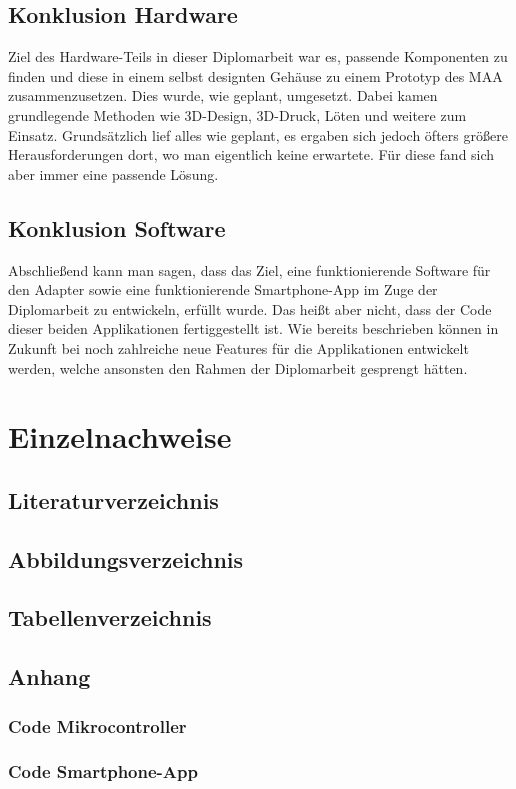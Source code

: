 \documentclass[11pt, twoside]{article}
\begin{document}
\subsection{Konklusion Hardware}
Ziel des Hardware-Teils in dieser Diplomarbeit war es, passende Komponenten zu finden und diese in einem selbst designten Gehäuse zu einem Prototyp des MAA zusammenzusetzen. Dies wurde, wie geplant, umgesetzt. Dabei kamen grundlegende Methoden wie 3D-Design, 3D-Druck, Löten und weitere zum Einsatz. Grundsätzlich lief alles wie geplant, es ergaben sich jedoch öfters größere Herausforderungen dort, wo man eigentlich keine erwartete. Für diese fand sich aber immer eine passende Lösung.
\subsection{Konklusion Software}
Abschließend kann man sagen, dass das Ziel, eine funktionierende Software für den Adapter sowie eine funktionierende Smartphone-App im Zuge der Diplomarbeit zu entwickeln, erfüllt wurde. Das heißt aber nicht, dass der Code dieser beiden Applikationen fertiggestellt ist. Wie bereits beschrieben können in Zukunft bei noch zahlreiche neue Features für die Applikationen entwickelt werden, welche ansonsten den Rahmen der Diplomarbeit gesprengt hätten.
\newpage
\section{Einzelnachweise}
\subsection{Literaturverzeichnis}
\printbibliography
\newpage
\subsection{Abbildungsverzeichnis}
\listoffigures
\subsection{Tabellenverzeichnis}
\listoftables
\newpage
\subsection{Anhang}
\subsubsection{Code Mikrocontroller}
\subsubsection{Code Smartphone-App}
\end{document}

